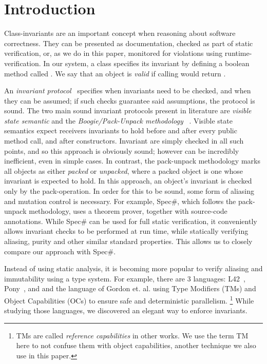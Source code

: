 \section{Introduction}
\label{s:intro}
Class-invariants are an important concept when reasoning about software correctness.
They can be presented as documentation, checked as part of static verification, or, as we do in this paper, monitored for violations using runtime-verification.
In our system, a class specifies its invariant by defining a boolean method called \Q@invariant@. We say that an object is \emph{valid} if calling \Q@invariant@ would return \Q@true@.

An \emph{invariant protocol}~\cite{FlexibleInvariants} specifies when invariants need to be checked, and when they can be assumed; if such checks guarantee said assumptions, the protocol is sound.
The two main sound invariant protocols present in literature are \emph{visible state semantic} \cite{Meyer:1988:OSC:534929} and the \emph{Boogie/Pack-Unpack methodology} ~\cite{DBLP:journals/jot/BarnettDFLS04}. Visible state semantics expect receivers invariants to hold before and after every public method call, and after constructors. Invariant are simply checked in all such points, and so this approach is obviously sound; however can be incredibly inefficient, even in simple cases.
In contrast, the pack-unpack methodology marks all objects as either \emph{packed} or \emph{unpacked}, where a packed object is one whose invariant is expected to hold.
In this approach, an object's invariant is checked only by the pack-operation.
In order for this to be sound, some form of aliasing and mutation control is necessary. For example, Spec\#, which follows the pack-unpack methodology, uses a theorem prover, together with source-code annotations.
While Spec\# can be used for full static verification, it conveniently allows invariant checks to be performed
at run time, while statically verifying aliasing, purity and other similar standard properties.
This allows us to closely compare our approach with Spec\#.

Instead of using static analysis, 
it is becoming more popular to verify aliasing and immutability using a type system.
For example, there are 3 languages: L42~\cite{ServettoZucca15,ServettoEtAl13a,JOT:issue_2011_01/article1,GianniniEtAl16}, Pony~\cite{clebsch2015deny,clebsch2017orca}, and and the language of Gordon et. al.\cite{GordonEtAl12} using Type Modifiers (TMs) and Object Capabilities (OCs) to ensure safe and deterministic parallelism.%
\footnote{TMs are called \emph{reference capabilities} in other works. We use the term TM here
to not confuse them with object capabilities, another technique we also use in this paper.}
While studying those languages, we discovered an elegant way to enforce invariants.


